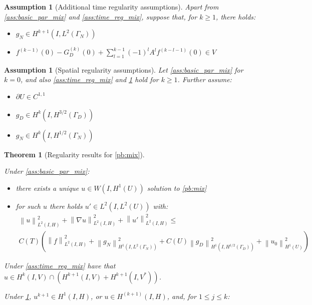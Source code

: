 \documentclass[english,a4paper,9pt,oneside]{scrbook}	%
\theoremstyle{break}
\newtheorem{thm}[equation]{Theorem}
\newtheorem{ass}[equation]{Assumption}
\theoremstyle{remark}
\newcommand{\norm}[1]{\left\lVert#1\right\rVert}
\begin{document}
\begin{appendices}
\begin{ass}[Additional time regularity assumptions]
\label{ass:add_time_reg_mix}
Apart from \cref{ass:basic_par_mix} and \cref{ass:time_reg_mix}, suppose that, for $k\geq 1$, there holds:

\begin{itemize}
	\item $g_N \in H^{k+1}(I, L^2(\Gamma_N))$
	\item $f^{(k-1)}(0) - G_D^{(k)}(0) + \sum_{l=1}^{k-1}(-1)^l A^l f^{(k-l-1)}(0)  \in V$
\end{itemize} 
\end{ass}


\begin{ass}[Spatial regularity assumptions]
\label{ass:space_reg_mix}
Let \cref{ass:basic_par_mix} for $k=0$, and also \cref{ass:time_reg_mix} and \cref{ass:add_time_reg_mix} hold for $k\geq 1$. Further assume:

\begin{itemize}
	\item $\partial U \in C^{1,1}$
	\item $g_D \in H^k(I,H^{3/2}(\Gamma_D))$
	\item $g_N \in H^k(I,H^{1/2}(\Gamma_N))$
\end{itemize}

\end{ass}


\begin{thm}[Regularity results for \cref{pb:mix}]
\label{thm:mix_reg}

Under \cref{ass:basic_par_mix}:

\begin{itemize}
	\item there exists a unique $u \in W(I,H^1(U))$ solution to \cref{pb:mix}
	\item for such $u$ there holds $u' \in L^2(I,L^2(U))$ with:
	\begin{align*}
	\norm{u}^2_{L^2(I,H)}+\norm{\nabla u}^2_{L^2(I,H)} + \norm{u'}^2_{L^2(I,H)} \leq \\
	C(T)\left (  \norm{f}_{L^2(I,H)}^2 +  \norm{g_N}^2_{H^1(I,L^2(\Gamma_N))}   + C(U) \norm{g_D}^2_{H^1(I,H^{1/2}(\Gamma_D))} + \norm{u_0}^2_{H^1(U)}\right )
\end{align*}
\end{itemize}

Under \cref{ass:time_reg_mix} have that $u \in H^k(I,V)\cap ( H^{k+1}(I,V) + H^{k+1}(I,V^*))$.


Under \cref{ass:add_time_reg_mix}, $u^{k+1} \in H^1(I,H)$, or $u \in H^{(k+1)}(I,H)$, and, for $1\leq j \leq k$:


\end{thm}
\end{appendices}
\end{document}
